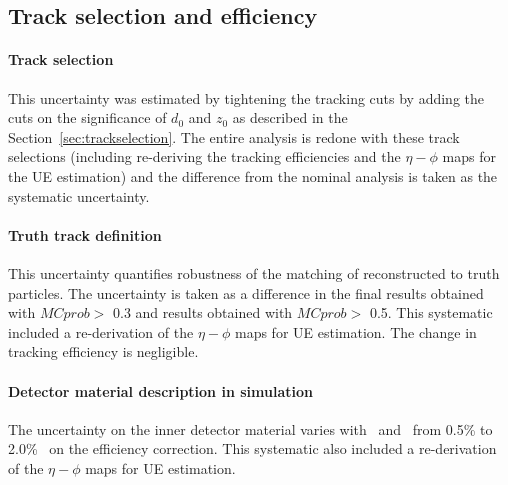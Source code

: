

\subsection{Track selection and efficiency}

\paragraph{Track selection}  This uncertainty was estimated by tightening the tracking cuts by adding the cuts
on the significance of $d_0$ and $z_0$ as described in the Section~\ref{sec:trackselection}.  
The entire analysis is redone with these track selections (including re-deriving the tracking efficiencies and the $\eta-\phi$ maps for the UE estimation) and the difference from the nominal analysis is taken as the systematic uncertainty. 



\paragraph{Truth track definition}  
This uncertainty quantifies robustness of the matching of reconstructed to truth particles.
The uncertainty is taken as a difference in the final results obtained with  $MCprob>$ 0.3 
and results obtained with $MCprob>$ 0.5. This systematic included a re-derivation of the $\eta-\phi$ maps for UE estimation. The change in tracking efficiency is negligible.


\paragraph{Detector material description in simulation}
The uncertainty on the inner detector material
varies with \pttrk\ and \etatrk\ from 0.5\% to 2.0\%~\cite{ref:tracktwiki} on the efficiency correction. This systematic also included a re-derivation of the $\eta-\phi$ maps for UE estimation.



